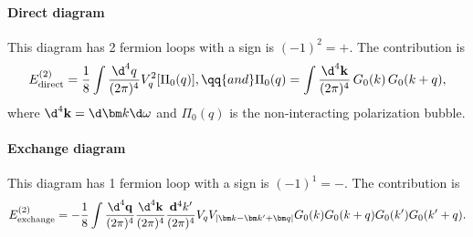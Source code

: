 \begin{solution}
\begin{enumext}
    \paragraph{Direct diagram}
    This diagram has 2 fermion loops with a sign is $(-1)^2 = +$.
    The contribution is
    \[
      E^{(2)}_\text{direct}
    = \frac18 \int \frac{\d^4q}{(2\pi)^4} V_q^2 [\Pi_0(q)], \qq{and}
      \Pi_0(q) = \int \frac{\d^4\mathbf k}{(2\pi)^4}\, G_0(k)\, G_0(k + q),
    \]
    where $\d^4\mathbf k = \d\bm k \d\omega$ and $\Pi_0(q)$ is the
    non-interacting polarization bubble.
    \paragraph{Exchange diagram}
    This diagram has 1 fermion loop with a sign is $(-1)^1 = -$.
    The contribution is
    \[
      E^{(2)}_\text{exchange}
    = -\frac18 \int \frac{\d^4\mathbf q}{(2\pi)^4}
      \frac{\d^4\mathbf k}{(2\pi)^4} \frac{\mathbf d^4k'}{(2\pi)^4}
      V_q V_{|\bm k - \bm k' + \bm q|}
      G_0(k) G_0(k + q) G_0(k') G_0(k' + q).
    \]
  \end{enumext}
\end{solution}